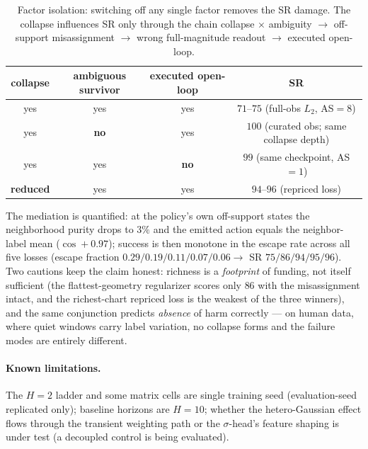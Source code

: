 \documentclass[11pt]{article}
\begin{document}
\begin{table}[h]\centering\small
\begin{tabular}{cccc}
\toprule
collapse & ambiguous survivor & executed open-loop & SR \\
\midrule
yes & yes & yes & $71$--$75$ \quad (full-obs $L_2$, AS$=8$) \\
yes & \textbf{no} & yes & $100$ \quad (curated obs; same collapse depth) \\
yes & yes & \textbf{no} & $99$ \quad (same checkpoint, AS$=1$) \\
\textbf{reduced} & yes & yes & $94$--$96$ \quad (repriced loss) \\
\bottomrule
\end{tabular}
\caption{Factor isolation: switching off any single factor removes the SR
damage. The collapse influences SR only through the chain collapse $\times$
ambiguity $\rightarrow$ off-support misassignment $\rightarrow$ wrong
full-magnitude readout $\rightarrow$ executed open-loop.}
\label{tab:factors}
\end{table}

The mediation is quantified: at the policy's own off-support states the
neighborhood purity drops to $3\%$ and the emitted action equals the
neighbor-label mean ($\cos +0.97$); success is then monotone in the escape
rate across all five losses (escape fraction
$0.29/0.19/0.11/0.07/0.06 \rightarrow$ SR $75/86/94/95/96$). Two cautions
keep the claim honest: richness is a \emph{footprint} of funding, not itself
sufficient (the flattest-geometry regularizer scores only $86$ with the
misassignment intact, and the richest-chart repriced loss is the weakest of
the three winners), and the same conjunction predicts \emph{absence} of harm
correctly --- on human data, where quiet windows carry label variation, no
collapse forms and the failure modes are entirely different.

\paragraph{Known limitations.} The $H{=}2$ ladder and some matrix cells are
single training seed (evaluation-seed replicated only); baseline horizons are
$H{=}10$; whether the hetero-Gaussian effect flows through the transient
weighting path or the $\sigma$-head's feature shaping is under test (a
decoupled control is being evaluated).
\end{document}
